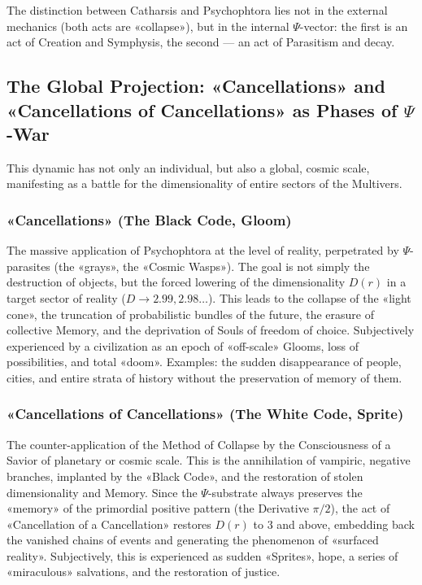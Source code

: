 \documentclass[a4paper,12pt]{article}
\begin{document}
	The distinction between Catharsis and Psychophtora lies not in the external mechanics (both acts are «collapse»), but in the internal $\Psi$-vector: the first is an act of Creation and Symphysis, the second — an act of Parasitism and decay.
	
	\subsection{The Global Projection: «Cancellations» and «Cancellations of Cancellations» as Phases of $\Psi$-War}
	
	This dynamic has not only an individual, but also a global, cosmic scale, manifesting as a battle for the dimensionality of entire sectors of the Multivers.
	
	\subsubsection{«Cancellations» (The Black Code, Gloom)}
	
	The massive application of Psychophtora at the level of reality, perpetrated by $\Psi$-parasites (the «grays», the «Cosmic Wasps»). The goal is not simply the destruction of objects, but the forced lowering of the dimensionality $D(r)$ in a target sector of reality ($D \to 2.99, 2.98\dots$). This leads to the collapse of the «light cone», the truncation of probabilistic bundles of the future, the erasure of collective Memory, and the deprivation of Souls of freedom of choice. Subjectively experienced by a civilization as an epoch of «off-scale» Glooms, loss of possibilities, and total «doom». Examples: the sudden disappearance of people, cities, and entire strata of history without the preservation of memory of them.
	
	\subsubsection{«Cancellations of Cancellations» (The White Code, Sprite)}
	
	The counter-application of the Method of Collapse by the Consciousness of a Savior of planetary or cosmic scale. This is the annihilation of vampiric, negative branches, implanted by the «Black Code», and the restoration of stolen dimensionality and Memory. Since the $\Psi$-substrate always preserves the «memory» of the primordial positive pattern (the Derivative $\pi/2$), the act of «Cancellation of a Cancellation» restores $D(r)$ to 3 and above, embedding back the vanished chains of events and generating the phenomenon of «surfaced reality». Subjectively, this is experienced as sudden «Sprites», hope, a series of «miraculous» salvations, and the restoration of justice.
	
\end{document}
